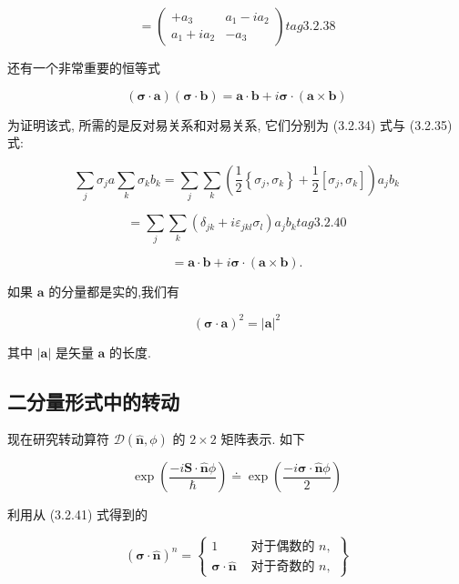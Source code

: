 $$
= \left( \begin{matrix} + {a}_{3} & {a}_{1} - i{a}_{2} \\ {a}_{1} + i{a}_{2} & - {a}_{3} \end{matrix}\right) tag{3. 2.38}
$$

还有一个非常重要的恒等式

$$
\left( {\mathbf{\sigma } \cdot \mathbf{a}}\right) \left( {\mathbf{\sigma } \cdot \mathbf{b}}\right) = \mathbf{a} \cdot \mathbf{b} + i\mathbf{\sigma } \cdot \left( {\mathbf{a} \times \mathbf{b}}\right) 
$$

为证明该式, 所需的是反对易关系和对易关系, 它们分别为 (3.2.34) 式与 (3.2.35) 式:

$$
\mathop{\sum }\limits_{j}{\sigma }_{j}a\mathop{\sum }\limits_{k}{\sigma }_{k}{b}_{k} = \mathop{\sum }\limits_{j}\mathop{\sum }\limits_{k}\left( {\frac{1}{2}\left\{ {{\sigma }_{j},{\sigma }_{k}}\right\} + \frac{1}{2}\left\lbrack {{\sigma }_{j},{\sigma }_{k}}\right\rbrack }\right) {a}_{j}{b}_{k}
$$

$$
= \mathop{\sum }\limits_{j}\mathop{\sum }\limits_{k}\left( {{\delta }_{jk} + i{\varepsilon }_{jkl}{\sigma }_{l}}\right) {a}_{j}{b}_{k} tag{3. 2.40}
$$

$$
= \mathbf{a} \cdot \mathbf{b} + i\mathbf{\sigma } \cdot \left( {\mathbf{a} \times \mathbf{b}}\right) .
$$

如果 $\mathbf{a}$ 的分量都是实的,我们有

$$
{\left( \mathbf{\sigma } \cdot \mathbf{a}\right) }^{2} = {\left| \mathbf{a}\right| }^{2}
$$

其中 $\left| \mathbf{a}\right|$ 是矢量 $\mathbf{a}$ 的长度.

\subsection{二分量形式中的转动}

现在研究转动算符 $\mathcal{D}\left( {\widehat{\mathbf{n}},\phi }\right)$ 的 $2 \times 2$ 矩阵表示. 如下

$$
\exp \left( \frac{-i\mathbf{S} \cdot \widehat{\mathbf{n}}\phi }{\hslash }\right) \doteq \exp \left( \frac{-i\mathbf{\sigma } \cdot \widehat{\mathbf{n}}\phi }{2}\right) 
$$

利用从 (3.2.41) 式得到的

$$
{\left( \mathbf{\sigma } \cdot \widehat{\mathbf{n}}\right) }^{n} = \left\{ \begin{array}{ll} 1 & \text{ 对于偶数的 }n, \\ \mathbf{\sigma } \cdot \widehat{\mathbf{n}} & \text{ 对于奇数的 }n, \end{array}\right\}
$$

